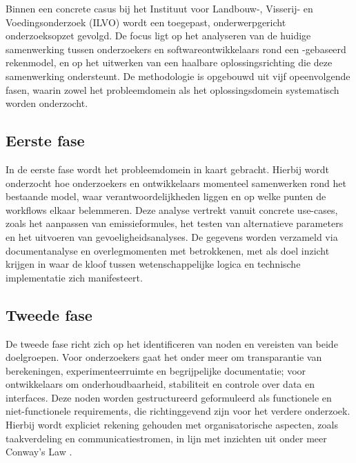 Binnen een concrete casus bij het Instituut voor Landbouw-, Visserij- en Voedingsonderzoek (ILVO) wordt een toegepast, onderwerpgericht onderzoeksopzet gevolgd. De focus ligt op het analyseren van de huidige samenwerking tussen onderzoekers en softwareontwikkelaars rond een -gebaseerd rekenmodel, en op het uitwerken van een haalbare oplossingsrichting die deze samenwerking ondersteunt. De methodologie is opgebouwd uit vijf opeenvolgende fasen, waarin zowel het probleemdomein als het oplossingsdomein systematisch worden onderzocht.

\subsection{Eerste fase}
In de eerste fase wordt het probleemdomein in kaart gebracht. Hierbij wordt onderzocht hoe onderzoekers en ontwikkelaars momenteel samenwerken rond het bestaande model, waar verantwoordelijkheden liggen en op welke punten de workflows elkaar belemmeren. Deze analyse vertrekt vanuit concrete use-cases, zoals het aanpassen van emissieformules, het testen van alternatieve parameters en het uitvoeren van gevoeligheidsanalyses. De gegevens worden verzameld via documentanalyse en overlegmomenten met betrokkenen, met als doel inzicht krijgen in waar de kloof tussen wetenschappelijke logica en technische implementatie zich manifesteert.

\subsection{Tweede fase}
De tweede fase richt zich op het identificeren van noden en vereisten van beide doelgroepen. Voor onderzoekers gaat het onder meer om transparantie van berekeningen, experimenteerruimte en begrijpelijke documentatie; voor ontwikkelaars om onderhoudbaarheid, stabiliteit en controle over data en interfaces. Deze noden worden gestructureerd geformuleerd als functionele en niet-functionele requirements, die richtinggevend zijn voor het verdere onderzoek. Hierbij wordt expliciet rekening gehouden met organisatorische aspecten, zoals taakverdeling en communicatiestromen, in lijn met inzichten uit onder meer Conway's Law \autocite{conwayslaw}.

